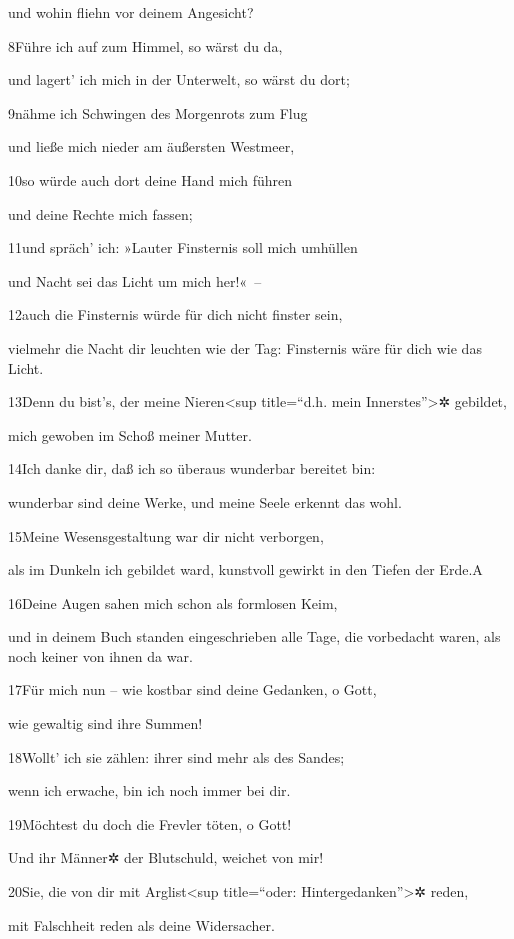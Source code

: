 und wohin fliehn vor deinem Angesicht?

8Führe ich auf zum Himmel, so wärst du da,

und lagert' ich mich in der Unterwelt, so wärst du dort;

9nähme ich Schwingen des Morgenrots zum Flug

und ließe mich nieder am äußersten Westmeer,

10so würde auch dort deine Hand mich führen

und deine Rechte mich fassen;

11und spräch' ich: »Lauter Finsternis soll mich umhüllen

und Nacht sei das Licht um mich her!«~--

12auch die Finsternis würde für dich nicht finster sein,

vielmehr die Nacht dir leuchten wie der Tag: Finsternis wäre für dich
wie das Licht.

13Denn du bist's, der meine Nieren\textless sup title=``d.h. mein
Innerstes''\textgreater✲ gebildet,

mich gewoben im Schoß meiner Mutter.

14Ich danke dir, daß ich so überaus wunderbar bereitet bin:

wunderbar sind deine Werke, und meine Seele erkennt das wohl.

15Meine Wesensgestaltung war dir nicht verborgen,

als im Dunkeln ich gebildet ward, kunstvoll gewirkt in den Tiefen der
Erde.{A}

16Deine Augen sahen mich schon als formlosen Keim,

und in deinem Buch standen eingeschrieben alle Tage, die vorbedacht
waren, als noch keiner von ihnen da war.

17Für mich nun -- wie kostbar sind deine Gedanken, o Gott,

wie gewaltig sind ihre Summen!

18Wollt' ich sie zählen: ihrer sind mehr als des Sandes;

wenn ich erwache, bin ich noch immer bei dir.

19Möchtest du doch die Frevler töten, o Gott!

Und ihr Männer✲ der Blutschuld, weichet von mir!

20Sie, die von dir mit Arglist\textless sup title=``oder:
Hintergedanken''\textgreater✲ reden,

mit Falschheit reden als deine Widersacher.

